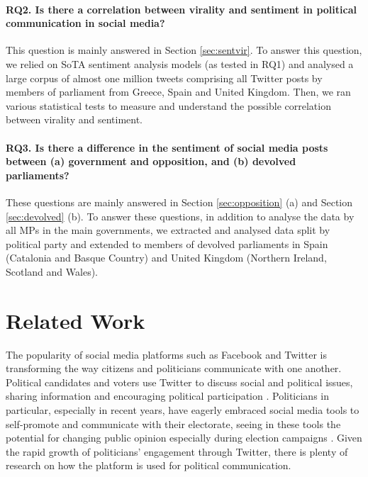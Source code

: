 \paragraph{RQ2. Is there a correlation between virality and sentiment in political communication in social media?} This question is mainly answered in Section \ref{sec:sentvir}. To answer this question, we relied on \ac{SoTA} sentiment analysis models (as tested in RQ1) and analysed a large corpus of almost one million tweets comprising all Twitter posts by members of parliament from Greece, Spain and United Kingdom. Then, we ran various statistical tests to measure and understand the possible correlation between virality and sentiment.

\paragraph{RQ3. Is there a difference in the sentiment of social media posts between (a) government and opposition, and (b) devolved parliaments?} These questions are mainly answered in Section \ref{sec:opposition} (a) and Section \ref{sec:devolved} (b). To answer these questions, in addition to analyse the data by all \acp{MP} in the main governments, we extracted and analysed data split by political party and extended to members of devolved parliaments in Spain (Catalonia and Basque Country) and United Kingdom (Northern Ireland, Scotland and Wales).


\section{Related Work}
The popularity of social media platforms such as Facebook and Twitter is transforming the way citizens and politicians communicate with one another. Political candidates and voters use Twitter to discuss social and political issues, sharing information and encouraging political participation \cite{kushin2013did}. Politicians in particular, especially in recent years, have eagerly embraced social media tools to self-promote and communicate with their electorate, seeing in these tools the potential for changing public opinion especially during election campaigns \cite{hong2011does}. Given the rapid growth of politicians' engagement through Twitter, there is plenty of research on how the platform is used for political communication.

